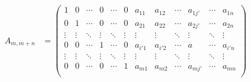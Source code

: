 \documentclass[dvipdfmx]{jsarticle}
\begin{document}
\begin{dfn}
\begin{align*}
  A_{m,m + n} &= \left( \begin{matrix}
  1 & 0 & \cdots & 0 & \cdots & 0 & a_{11} & a_{12} & \cdots & a_{1j'} & \cdots & a_{1n} \\
  0 & 1 & \cdots & 0 & \cdots & 0 & a_{21} & a_{22} & \cdots & a_{2j'} & \cdots & a_{2n} \\
   \vdots & \vdots & \ddots & \vdots & \ddots & \vdots & \vdots & \vdots & \ddots & \vdots & \ddots & \vdots \\
  0 & 0 & \cdots & 1 & \cdots & 0 & a_{i'1} & a_{i'2} & \cdots & a & \cdots & a_{i'n} \\
   \vdots & \vdots & \ddots & \vdots & \ddots & \vdots & \vdots & \vdots & \ddots & \vdots & \ddots & \vdots \\
  0 & 0 & \cdots & 0 & \cdots & 1 & a_{m1} & a_{m2} & \cdots & a_{mj'} & \cdots & a_{mn} \\
  \end{matrix} \right)
\end{align*}
\begin{comment}
\begin{align*}
A_{m,m + n} &= \left( \begin{matrix}
1 & 0 & \cdots & 0 & \cdots & 0 \\
0 & 1 & \cdots & 0 & \cdots & 0 \\
 \vdots & \vdots & \ddots & \vdots & \ddots & \vdots \\
0 & 0 & \cdots & 1 & \cdots & 0 \\
 \vdots & \vdots & \ddots & \vdots & \ddots & \vdots \\
0 & 0 & \cdots & 0 & \cdots & 1 \\
\end{matrix} \ \begin{matrix}
a_{11} & a_{12} & \cdots & a_{1j'} & \cdots & a_{1n} \\
a_{21} & a_{22} & \cdots & a_{2j'} & \cdots & a_{2n} \\
 \vdots & \vdots & \ddots & \vdots & \ddots & \vdots \\
a_{i'1} & a_{i'2} & \cdots & a & \cdots & a_{i'n} \\
 \vdots & \vdots & \ddots & \vdots & \ddots & \vdots \\
a_{m1} & a_{m2} & \cdots & a_{mj'} & \cdots & a_{mn} \\
\end{matrix} \right)

\end{comment}
\end{dfn}
\end{document}
